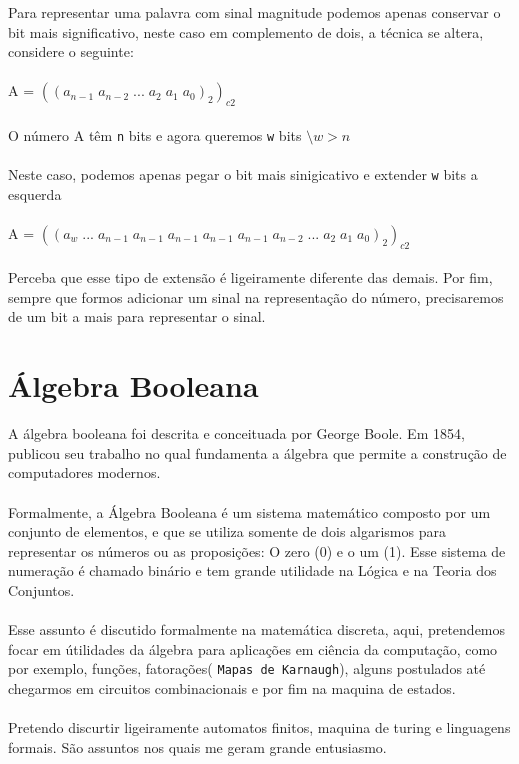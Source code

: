 \documentclass[12pt, onecolumn]{article}
\begin{document}
	Para representar uma palavra com sinal magnitude
	podemos apenas conservar o bit mais significativo, neste caso
	em complemento de dois, a técnica se altera, considere o seguinte:\\
	\\
	A = $((a_{n-1} \; a_{n-2} \; ... \; a_{2} \; a_{1} \; a_{0})_2)_{c2}$\\
	\\
	O número A têm \texttt{n} bits e agora queremos \texttt{w} bits
	$\setminus w > n$\\
	\\
	Neste caso, podemos apenas pegar o bit mais sinigicativo e extender
	\texttt{w} bits a esquerda\\
	\\
	A = $((a_{w} \; ... \;a_{n-1}\;a_{n-1}\;a_{n-1}\;a_{n-1}\;a_{n-1} 
	\; a_{n-2} \; ... \; a_{2} \; a_{1} \; a_{0})_2)_{c2}$\\
	\\
	Perceba que esse tipo de extensão é ligeiramente diferente das demais.
	Por fim, sempre que formos adicionar um sinal na representação do
	número, precisaremos de um bit a mais para representar o sinal.

		\section{\centering Álgebra Booleana}

	A álgebra booleana foi descrita e conceituada por George Boole. 
	Em 1854, publicou seu trabalho no qual fundamenta a álgebra que 
	permite a construção de computadores modernos.\\
	\\
	Formalmente, a Álgebra Booleana é um sistema matemático composto 
	por um conjunto de elementos, e que se utiliza somente de dois 
	algarismos para representar os números ou as proposições: 
	O zero (0) e o um (1). Esse sistema de numeração é chamado binário 
	e tem grande utilidade na Lógica e na Teoria dos Conjuntos.\\
	\\
	Esse assunto é discutido formalmente na matemática discreta, 
	aqui, pretendemos focar em útilidades da álgebra para aplicações
	em ciência da computação, como por exemplo, funções, fatorações( 
	\texttt{Mapas de Karnaugh}), alguns postulados até chegarmos em 
	circuitos combinacionais e por fim na maquina de estados.\\
	\\
	Pretendo discurtir ligeiramente automatos finitos, maquina de turing 
	e linguagens formais. São assuntos nos quais me geram 
	grande entusiasmo.\\
\end{document}
